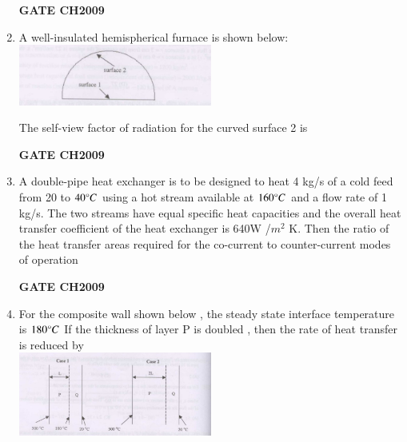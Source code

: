 \documentclass[journal,12pt,onecolumn]{IEEEtran}
\theoremstyle{remark}
\begin{document}
\begin{enumerate}
		\hfill
		\textbf{GATE CH2009} 
		
		\item A well-insulated hemispherical furnace  is shown below: \\
		\includegraphics[width=0.5\textwidth]{q33.png}
		
		The self-view factor of radiation for the curved surface 2 is 
		\begin{enumerate}
		\end{enumerate}
		
		\hfill
		\textbf{GATE CH2009} 
		
		\item A double-pipe heat exchanger is to be designed to heat 4 kg/s of a cold feed from 20 to $40\degree C$ using a hot stream available at $160\degree C$ and a flow rate of 1 kg/s. The two streams have equal specific heat capacities and the overall heat transfer coefficient of the heat exchanger is 640W /$m^2$ K. Then the ratio of the heat transfer areas required for the co-current to counter-current modes of operation 
		\begin{enumerate}
			\begin{multicols}{2}
				\item 0.92
				\item 0.73
				\item 1.085
				\item 1.25
			\end{multicols}
		\end{enumerate}
		
		\hfill
		\textbf{GATE CH2009} 
		
		\item For the composite wall shown below , the steady state interface temperature is $180\degree C$ If the thickness of layer P is doubled , then the rate of heat transfer  is reduced by \\
		\includegraphics[width=0.5\textwidth]{q35.png}
		

\end{enumerate}
\end{document}

